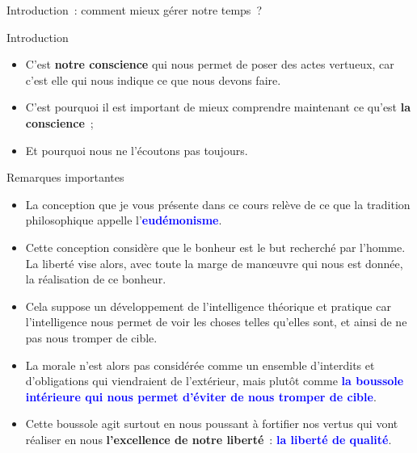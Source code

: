 \documentclass[11pt,xcolor=dvipsname,ignorenonframetext,handout]{beamer}
\begin{document}
\begin{frame}{Introduction~: comment mieux gérer notre temps~?}
\begin{frame}{Introduction}
\begin{itemize}
        \rightskip=0pt\leftskip=0pt
        \item C'est \textbf{notre conscience} qui nous permet de poser des actes vertueux, car c'est elle qui nous indique ce que nous devons faire.
        \item C'est pourquoi il est important de mieux comprendre maintenant ce qu'est \textbf{la conscience}~;
        \item Et pourquoi nous ne l'écoutons pas toujours.
    \end{itemize}
\end{frame}
\begin{frame}{Remarques importantes}
    \begin{itemize}
    \rightskip=0pt\leftskip=0pt    
    \item La conception que je vous présente dans ce cours relève de ce que la tradition philosophique appelle l'\textcolor{blue}{\textbf{eudémonisme}}.
    \item Cette conception considère que le bonheur est le but recherché par l'homme. La liberté vise alors, avec toute la marge de manœuvre qui nous est donnée, la réalisation de ce bonheur. 
    \item Cela suppose un développement de l'intelligence théorique et pratique car l'intelligence nous permet de voir les choses telles qu'elles sont, et ainsi de ne pas nous tromper de cible. 
    \item La morale n'est alors pas considérée comme un ensemble d'interdits et d'obligations qui viendraient de l'extérieur, mais plutôt comme \textcolor{blue}{\textbf{la boussole intérieure qui nous permet d'éviter de nous tromper de cible}}.
    \item Cette boussole agit surtout en nous poussant à fortifier nos vertus qui vont réaliser en nous \textbf{l'excellence de notre liberté}~: \textcolor{blue}{\textbf{la liberté de qualité}}.
    \end{itemize}
\end{frame}

\end{frame}
\end{document}
